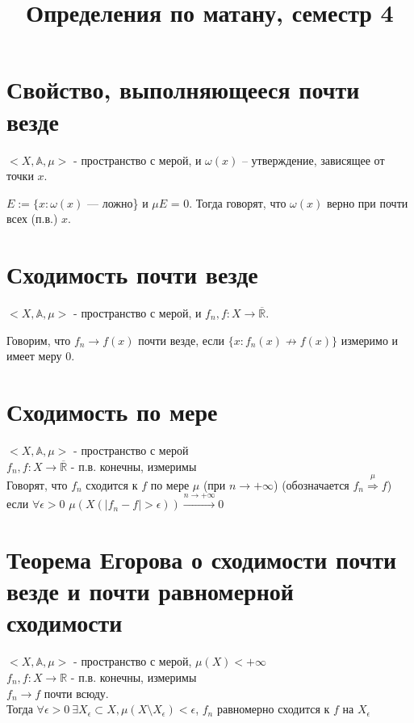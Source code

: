 \documentclass[paper=a4, fontsize=17pt]{article}
\title{Определения по матану, семестр 4}
\begin{document}
	\maketitle
	\tableofcontents
	\newpage

	\section{Свойство, выполняющееся почти везде}
	$<X,\mathds{A},\mu>$  - пространство с мерой, и $\omega (x)$  -- утверждение, зависящее от точки $x$.

	$E := \{x: \omega(x) $ --- ложно\} и $\mu E$ = 0. Тогда говорят, что $\omega (x)$ верно при почти всех (п.в.) $x$.

	\section{Сходимость почти везде}
	$<X,\mathds{A},\mu>$  - пространство с мерой, и $f_n, f: X \rightarrow \overline{\mathds{R}}.$

	Говорим, что $f_n \rightarrow f(x)$ почти везде, если $\{x: f_n(x) \not \rightarrow f(x)\}$ измеримо и имеет меру $0$.

	\section{Сходимость по мере}
	$<X, \mathds{A}, \mu>$ - пространство с мерой \\
	$f_n , f : X \rightarrow \overline{\mathds{R}}$ - п.в. конечны, измеримы\\
	Говорят, что $f_n$ сходится к $f$ по мере $\mu$ (при $n \rightarrow +\infty$) (обозначается $f_n\stackrel{\mu}{\Rightarrow}f$) если $\forall\epsilon > 0$ $\mu(X(|f_n - f| > \epsilon))\stackrel{n\rightarrow+\infty}{\rightarrow} 0$

	\section{Теорема Егорова о сходимости почти везде и почти равномерной сходимости}
	$<X, \mathds{A}, \mu>$ - пространство с мерой, $\mu(X) < + \infty$\\
	$f_n , f : X \rightarrow \mathds{R}$ - п.в. конечны, измеримы \\
	$f_n \rightarrow f$ почти всюду. \\
	Тогда $\forall \epsilon > 0\ \exists X_{\epsilon} \subset X, \mu(X \setminus X_{\epsilon}) < \epsilon$, $f_n$ равномерно сходится к $f$ на $X_{\epsilon}$
\end{document}
